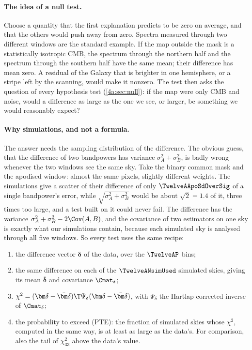 \paragraph{The idea of a null test.} Choose a quantity that the first explanation predicts to be zero on
average, and that the others would push away from zero. Spectra measured through two different windows are
the standard example. If the map outside the mask is a statistically isotropic CMB, the spectrum through the
northern half and the spectrum through the southern half have the same mean; their difference has mean zero.
A residual of the Galaxy that is brighter in one hemisphere, or a stripe left by the scanning, would make it
nonzero. The test then asks the question of every hypothesis test (\cref{4a:sec:null}): if the map were only
CMB and noise, would a difference as large as the one we see, or larger, be something we would reasonably
expect?

\paragraph{Why simulations, and not a formula.} The answer needs the sampling distribution of the difference.
The obvious guess, that the difference of two bandpowers has variance $\sigma_A^2+\sigma_B^2$, is badly wrong
whenever the two windows see the same sky. Take the binary common mask and the apodised window: almost the
same pixels, slightly different weights. The simulations give a scatter of their difference of only
$\TwelveAApoSdOverSig$ of a single bandpower's error, while $\sqrt{\sigma_A^2+\sigma_B^2}$ would be about
$\sqrt2=1.4$ of it, three times too large, and a test built on it could never fail. The difference has the
variance $\sigma_A^2+\sigma_B^2-2\Cov(A,B)$, and the covariance of two estimators on one sky is exactly what our
simulations contain, because each simulated sky is analysed through all five windows. So every test uses the
same recipe:
\begin{enumerate}[itemsep=2pt,leftmargin=1.5em]
  \item the difference vector $\bm\delta$ of the data, over the $\TwelveAP$ bins;
  \item the same difference on each of the $\TwelveANsimUsed$ simulated skies, giving its mean $\bar{\bm\delta}$ and
        covariance $\Cmat_\delta$;
  \item $\chi^2=(\bm\delta-\bar{\bm\delta})\T\Psi_\delta(\bm\delta-\bar{\bm\delta})$, with $\Psi_\delta$ the Hartlap-corrected
        inverse of $\Cmat_\delta$;
  \item the probability to exceed (PTE): the fraction of simulated skies whose $\chi^2$, computed in the same way,
        is at least as large as the data's. For comparison, also the tail of $\chi^2_{33}$ above the data's value.
\end{enumerate}

